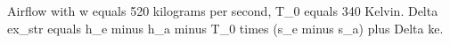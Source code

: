 Airflow with w equals 520 kilograms per second, T_0 equals 340 Kelvin.  
Delta ex_str equals h_e minus h_a minus T_0 times (s_e minus s_a) plus Delta ke.